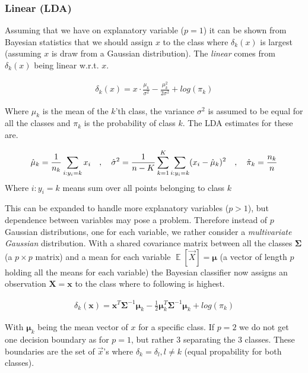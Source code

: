 \documentclass{article}
\renewcommand{\vec}[1]{\mathbf{#1}} %
\newcommand{\vecsym}[1]{\boldsymbol{#1}} %
\DeclareMathOperator*{\E}{\mathbb{E}}
\begin{document}
\subsubsection{Linear (LDA)}
Assuming that we have on explanatory variable ($p=1$) it can be shown from Bayesian statistics that we should assign $x$ to the class where $\delta_k(x)$ is largest (assuming $x$ is draw from a Gaussian distribution). The \textit{linear} comes from $\delta_k(x)$ being linear w.r.t. $x$.

\begin{align*}
    \delta_k (x) = x \cdot \frac{\mu_k}{\sigma^2} - \frac{\mu_k^2}{2\sigma^2} + log(\pi_k)
\end{align*}

Where $\mu_k$ is the mean of the $k$'th class, the variance $\sigma^2$ is assumed to be equal for all the classes and $\pi_k$ is the probability of class $k$. The LDA estimates for these are.

\begin{align*}
    \hat{\mu}_k = \frac{1}{n_k} \sum_{i:y_i=k} x_i \hspace{10px},\hspace{10px} \hat{\sigma}^2 = \frac{1}{n-K} \sum_{k=1}^{K} \sum_{i:y_i = k} (x_i-\hat{\mu}_k)^2 \hspace{10px},\hspace{10px} \hat{\pi}_k = \frac{n_k}{n}
\end{align*}
Where $i:y_i = k$ means sum over all points belonging to class $k$

This can be expanded to handle more explanatory variables ($p>1$), but dependence between variables may pose a problem. Therefore instead of $p$ Gaussian distributions, one for each variable, we rather consider a \textit{multivariate Gaussian} distribution. With a shared covariance matrix between all the classes $\vec{\Sigma}$ (a $p \times p$ matrix) and a mean for each variable $\E [\Vec{X}] = \vecsym{\mu}$ (a vector of length $p$ holding all the means for each variable) the Bayesian classifier now assigns an observation $\vec{X} = \vec{x}$ to the class where to following is highest.

\begin{align*}
    \delta_k (\vec{x}) = \vec{x}^T \vecsym{\Sigma}^{-1} \vecsym{\mu}_k - \frac{1}{2} \vecsym{\mu}_k^T \vecsym{\Sigma}^{-1} \vecsym{\mu}_k + log(\pi_k)
\end{align*}

With $\vecsym{\mu}_k$ being the mean vector of $x$ for a specific class. If $p = 2$ we do not get one decision boundary as for $p=1$, but rather 3 separating the 3 classes. These boundaries are the set of $\Vec{x}$'s where $\delta_k = \delta_l, l \neq k$ (equal propability for both classes).
\end{document}
